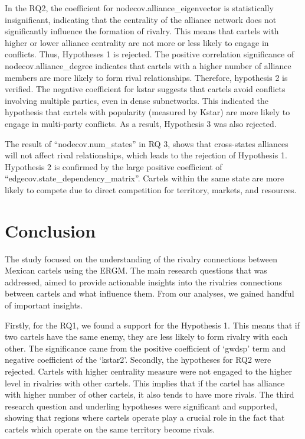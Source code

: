 \documentclass[
]{article}
\begin{document}
In the RQ2, the coefficient for nodecov.alliance\_eigenvector is
statistically insignificant, indicating that the centrality of the
alliance network does not significantly influence the formation of
rivalry. This means that cartels with higher or lower alliance
centrality are not more or less likely to engage in conflicts. Thus,
Hypotheses 1 is rejected. The positive correlation significance of
nodecov.alliance\_degree indicates that cartels with a higher number of
alliance members are more likely to form rival relationships. Therefore,
hypothesis 2 is verified. The negative coefficient for kstar suggests
that cartels avoid conflicts involving multiple parties, even in dense
subnetworks. This indicated the hypothesis that cartels with popularity
(measured by Kstar) are more likely to engage in multi-party conflicts.
As a result, Hypothesis 3 was also rejected.

The result of ``nodecov.num\_states'' in RQ 3, shows that cross-states
alliances will not affect rival relationships, which leads to the
rejection of Hypothesis 1. Hypothesis 2 is confirmed by the large
positive coefficient of ``edgecov.state\_dependency\_matrix''. Cartels
within the same state are more likely to compete due to direct
competition for territory, markets, and resources.

\section{Conclusion}\label{conclusion}

The study focused on the understanding of the rivalry connections
between Mexican cartels using the ERGM. The main research questions that
was addressed, aimed to provide actionable insights into the rivalries
connections between cartels and what influence them. From our analyses,
we gained handful of important insights.

Firstly, for the RQ1, we found a support for the Hypothesis 1. This
means that if two cartels have the same enemy, they are less likely to
form rivalry with each other. The significance came from the positive
coefficient of `gwdsp' term and negative coefficient of the `kstar2'.
Secondly, the hypotheses for RQ2 were rejected. Cartels with higher
centrality measure were not engaged to the higher level in rivalries
with other cartels. This implies that if the cartel has alliance with
higher number of other cartels, it also tends to have more rivals. The
third research question and underling hypotheses were significant and
supported, showing that regions where cartels operate play a crucial
role in the fact that cartels which operate on the same territory become
rivals.
\end{document}
